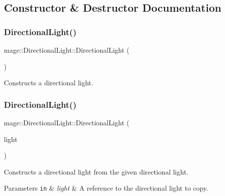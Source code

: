 \subsection{Constructor \& Destructor Documentation}
\hypertarget{classmage_1_1_directional_light_aa773f5b1f922b300ec91c0f7fa064b68}{}\label{classmage_1_1_directional_light_aa773f5b1f922b300ec91c0f7fa064b68} 
\subsubsection{\texorpdfstring{Directional\+Light()}{DirectionalLight()}\hspace{0.1cm}{\footnotesize\ttfamily [1/3]}}
{\footnotesize\ttfamily mage\+::\+Directional\+Light\+::\+Directional\+Light (\begin{DoxyParamCaption}{ }\end{DoxyParamCaption})}

Constructs a directional light. \hypertarget{classmage_1_1_directional_light_a777b1b8e00a51ba84f6af774a7b519ea}{}\label{classmage_1_1_directional_light_a777b1b8e00a51ba84f6af774a7b519ea} 
\subsubsection{\texorpdfstring{Directional\+Light()}{DirectionalLight()}\hspace{0.1cm}{\footnotesize\ttfamily [2/3]}}
{\footnotesize\ttfamily mage\+::\+Directional\+Light\+::\+Directional\+Light (\begin{DoxyParamCaption}\item[{const \hyperlink{classmage_1_1_directional_light}{Directional\+Light} \&}]{light }\end{DoxyParamCaption})\hspace{0.3cm}{\ttfamily [default]}}

Constructs a directional light from the given directional light.


\begin{DoxyParams}[1]{Parameters}
\mbox{\tt in}  & {\em light} & A reference to the directional light to copy. \\
\hline
\end{DoxyParams}
\hypertarget{classmage_1_1_directional_light_a9563b260b550057e951500c40ecbe2d3}{}\label{classmage_1_1_directional_light_a9563b260b550057e951500c40ecbe2d3} 
